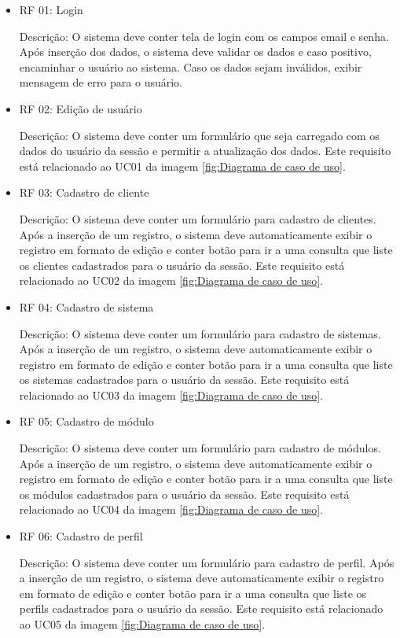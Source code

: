 \begin{itemize}
	
	
\item RF 01: Login


Descrição: O sistema deve conter tela de login com os campos email e senha. Após inserção dos dados, o sistema deve validar os dados e caso positivo, encaminhar o usuário ao sistema. Caso os dados sejam inválidos, exibir mensagem de erro para o usuário.


\item RF 02: Edição de usuário


Descrição: O sistema deve conter um formulário que seja carregado com os dados do usuário da sessão e permitir a atualização dos dados. Este requisito está relacionado ao UC01 da imagem \ref{fig:Diagrama de caso de uso}.


\item RF 03: Cadastro de cliente


Descrição: O sistema deve conter um formulário para cadastro de clientes. Após a inserção de um registro, o sistema deve automaticamente exibir o registro em formato de edição e conter botão para ir a uma consulta que liste os clientes cadastrados para o usuário da sessão. Este requisito está relacionado ao UC02 da imagem \ref{fig:Diagrama de caso de uso}.


\item RF 04: Cadastro de sistema


Descrição: O sistema deve conter um formulário para cadastro de sistemas. Após a inserção de um registro, o sistema deve automaticamente exibir o registro em formato de edição e conter botão para ir a uma consulta que liste os sistemas cadastrados para o usuário da sessão. Este requisito está relacionado ao UC03 da imagem \ref{fig:Diagrama de caso de uso}.


\item RF 05: Cadastro de módulo


Descrição: O sistema deve conter um formulário para cadastro de módulos. Após a inserção de um registro, o sistema deve automaticamente exibir o registro em formato de edição e conter botão para ir a uma consulta que liste os módulos cadastrados para o usuário da sessão. Este requisito está relacionado ao UC04 da imagem \ref{fig:Diagrama de caso de uso}.


\item RF 06: Cadastro de perfil


Descrição: O sistema deve conter um formulário para cadastro de perfil. Após a inserção de um registro, o sistema deve automaticamente exibir o registro em formato de edição e conter botão para ir a uma consulta que liste os perfils cadastrados para o usuário da sessão. Este requisito está relacionado ao UC05 da imagem \ref{fig:Diagrama de caso de uso}.



\end{itemize}
